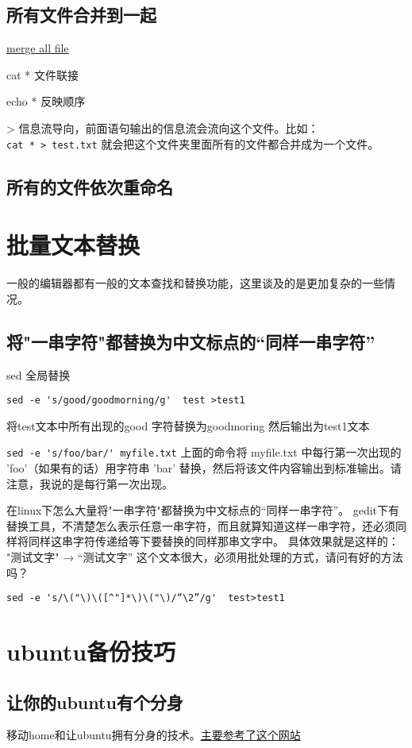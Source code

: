 \documentclass[11pt,oneside]{book}
\begin{document}
\begin{common-format}
\section{所有文件合并到一起}
\href{http://unix.stackexchange.com/questions/3770/how-to-merge-all-text-files-in-a-directory-into-one}{merge all file}

cat *
文件联接

echo *
反映顺序


> 信息流导向，前面语句输出的信息流会流向这个文件。比如：\\
\verb+cat * > test.txt+
就会把这个文件夹里面所有的文件都合并成为一个文件。

\section{所有的文件依次重命名}


\chapter{批量文本替换}
一般的编辑器都有一般的文本查找和替换功能，这里谈及的是更加复杂的一些情况。

\section{将"一串字符"都替换为中文标点的“同样一串字符”}
sed 全局替换

\verb+sed -e 's/good/goodmorning/g'  test >test1+

将test文本中所有出现的good 字符替换为goodmoring 然后输出为test1文本

\verb+sed -e 's/foo/bar/' myfile.txt+
上面的命令将 myfile.txt 中每行第一次出现的 'foo'（如果有的话）用字符串 'bar' 替换，然后将该文件内容输出到标准输出。请注意，我说的是每行第一次出现。

在linux下怎么大量将"一串字符"都替换为中文标点的“同样一串字符”。 gedit下有替换工具，不清楚怎么表示任意一串字符，而且就算知道这样一串字符，还必须同样将同样这串字符传递给等下要替换的同样那串文字中。 具体效果就是这样的： "测试文字" → “测试文字”
这个文本很大，必须用批处理的方式，请问有好的方法吗？

\verb+sed -e 's/\("\)\([^"]*\)\("\)/“\2”/g'  test>test1+



\chapter{ubuntu备份技巧}
\section{让你的ubuntu有个分身}
移动home和让ubuntu拥有分身的技术。\href{http://wangmm2008.blog.163.com/blog/static/1812740122011111112842470/}{主要参考了这个网站}


\end{common-format}
\end{document}
